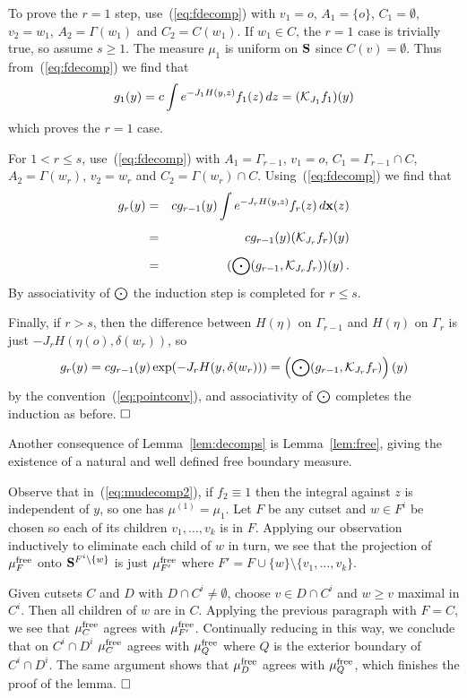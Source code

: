 To prove the $r=1$ step, use~(\ref{eq:fdecomp}) with $v_1 = o$, 
$A_1 = \{ o \}$, $C_1 = \emptyset$, $v_2 = w_1$, $A_2 = \Gamma (w_1)$ 
and $C_2 = C(w_1)$.  If $w_1 \in C$, the $r=1$ case is 
trivially true, so assume $s \geq 1$.
The measure $\mu_1$ is uniform on $\S$ since $C(v) = \emptyset$.
Thus from~(\ref{eq:fdecomp}) we find that
$$g_1 (y) = c \int e^{-J_1 H (y,z)} f_1 (z) \, dz 
   = (\K_{J_1} f_1) (y)$$
which proves the $r = 1$ case.  

For $1 < r \leq s$, use~(\ref{eq:fdecomp}) with $A_1 = \Gamma_{r-1}$,
$v_1 = o$, $C_1 = \Gamma_{r-1} \cap C$, $A_2 = \Gamma (w_r)$,
$v_2 = w_r$ and $C_2 = \Gamma (w_r) \cap C$.  
Using~(\ref{eq:fdecomp}) we find that
\begin{eqnarray*}
g_r (y) & = & c g_{r-1} (y) \int e^{-J_r H (y,z)} 
   f_r (z) \, \dx (z) \\[1ex]
& = & c g_{r-1} (y) (\K_{J_r} f_r) (y) \\[1ex]
& = & (\poi (g_{r-1} , \K_{J_r} f_r)) (y) \, .
\end{eqnarray*}
By associativity of $\poi$ the induction step is completed for $r \leq s$.

Finally, if $r > s$, then the difference between $H (\eta)$ on
$\Gamma_{r-1}$ and $H (\eta)$ on $\Gamma_r$ is just $- J_r
H(\eta (o) , \delta (w_r))$, so 
$$g_r (y) = c g_{r-1} (y) \exp (- J_r 
H(y , \delta (w_r))) = \left ( \poi 
   (g_{r-1} , \K_{J_r} f_r) \right ) (y)$$
by the convention~(\ref{eq:pointconv}), and associativity of $\poi$
completes the induction as before.
$\qed$

Another consequence of Lemma~\ref{lem:decomps} is Lemma~\ref{lem:free},
giving the existence of a natural and well defined free boundary measure.

Observe that in~(\ref{eq:mudecomp2}), if $f_2 \equiv 1$ then 
the integral against $z$ is independent of $y$, so one has 
$\mu^{(1)} = \mu_1$.  Let $F$ be any cutset and $w \in F^i$ be
chosen so each of its children $v_1 , \ldots , v_k$ is in $F$.  
Applying our observation inductively to eliminate each child 
of $w$ in turn, we see that the projection of $\mufree_F$ onto 
$\S^{F^i \setminus \{ w \}}$ is just $\mufree_{F'}$ where 
$F' = F \cup \{ w \} \setminus \{ v_1 , \ldots , v_k \}$.  

Given cutsets $C$ and $D$ with $D \cap C^i \neq \emptyset$, choose 
$v \in D \cap C^i$ and $w \geq v$ maximal in $C^i$.  Then all
children of $w$ are in $C$.  Applying the previous paragraph
with $F = C$, we see that $\mufree_C$ agrees with $\mufree_{F'}$.
Continually reducing in this way, we conclude that on $C^i \cap D^i$
$\mufree_C$ agrees with $\mufree_Q$ where $Q$ is the
exterior boundary of $C^i \cap D^i$.  The same argument shows
that $\mufree_D$ agrees with $\mufree_Q$, which finishes the
proof of the lemma.
$\qed$

